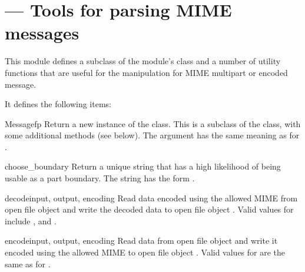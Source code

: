 \section{ ---
         Tools for parsing MIME messages}



This module defines a subclass of the
 module's
 class and a number of utility functions that are
useful for the manipulation for MIME multipart or encoded message.

It defines the following items:

\begin{classdesc}{Message}{fp}
Return a new instance of the  class.  This is a
subclass of the  class, with some additional
methods (see below).  The  argument has the same meaning
as for .
\end{classdesc}

\begin{funcdesc}{choose_boundary}{}
Return a unique string that has a high likelihood of being usable as a
part boundary.  The string has the form
.
\end{funcdesc}

\begin{funcdesc}{decode}{input, output, encoding}
Read data encoded using the allowed MIME  from open file
object  and write the decoded data to open file object
.  Valid values for  include
,  and .
\end{funcdesc}

\begin{funcdesc}{encode}{input, output, encoding}
Read data from open file object  and write it encoded using
the allowed MIME  to open file object .
Valid values for  are the same as for .
\end{funcdesc}

